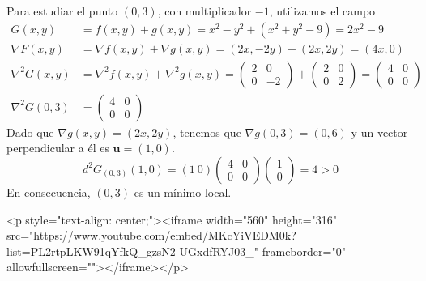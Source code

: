 \begin{ejemplo}
Para estudiar el punto $(0,3)$,  con multiplicador $-1$, utilizamos el campo
\begin{align*}
G(x,y)&=f(x,y)+g(x,y)=x^2-y^2+(x^2+y^2-9)=2x^2-9\\
\nabla F(x,y)&=\nabla f(x,y) +\nabla g(x,y)=(2x,-2y)+(2x,2y)=
(4x, 0)\\
\nabla^2 G(x,y)&=
\nabla^2 f(x,y) +\nabla^2 g(x,y)=
\begin{pmatrix}
2 & 0\\
0 & -2
\end{pmatrix}+
\begin{pmatrix}
2 & 0\\
0 & 2
\end{pmatrix}=
\begin{pmatrix}
4 & 0\\
0 & 0
\end{pmatrix}\\
\nabla^2 G(0,3)&=
\begin{pmatrix}
4 & 0\\
0 & 0
\end{pmatrix}
\end{align*}
Dado que $\nabla g(x,y)=(2x,2y)$, tenemos que $\nabla g(0,3)=(0,6)$ y un vector perpendicular a él es $\boldsymbol u=(1,0)$.
\[
d^2G_{(0,3)}(1,0)=(1\ 0)
\begin{pmatrix}
4 & 0\\
0 & 0
\end{pmatrix}
\begin{pmatrix}
1\\
0 
\end{pmatrix} = 4 >0
\]
En consecuencia, $(0,3)$ es un mínimo local.\fej
\end{ejemplo}

\begin{rawhtml}
<p style="text-align: center;"><iframe width="560" height="316" src="https://www.youtube.com/embed/MKcYiVEDM0k?list=PL2rtpLKW91qYfkQ_gzsN2-UGxdfRYJ03_" frameborder="0" allowfullscreen=""></iframe></p>
\end{rawhtml}


